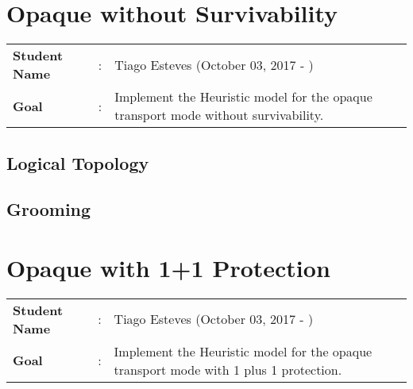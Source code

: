 \clearpage

\section{Opaque without Survivability}\label{heuristic_Opaque_Survivability}
\begin{tcolorbox}	
\begin{tabular}{p{2.75cm} p{0.2cm} p{10.5cm}} 	
\textbf{Student Name}  &:& Tiago Esteves    (October 03, 2017 - )\\
\textbf{Goal}          &:& Implement the Heuristic model for the opaque transport mode without survivability.
\end{tabular}
\end{tcolorbox}

\subsection{Logical Topology}

\subsection{Grooming}


\newpage
\section{Opaque with 1+1 Protection}
\begin{tcolorbox}	
\begin{tabular}{p{2.75cm} p{0.2cm} p{10.5cm}} 	
\textbf{Student Name}  &:& Tiago Esteves    (October 03, 2017 - )\\
\textbf{Goal}          &:& Implement the Heuristic model for the opaque transport mode with 1 plus 1 protection.
\end{tabular}
\end{tcolorbox}
